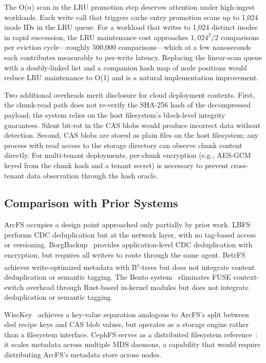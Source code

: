 \documentclass[5p,times]{elsarticle}
\begin{document}
The O($n$) scan in the LRU promotion step deserves attention under
high-ingest workloads. Each write call that triggers cache entry promotion
scans up to 1,024 inode IDs in the LRU queue.  For a workload that
writes to 1,024 distinct inodes in rapid succession, the LRU maintenance
cost approaches $1{,}024^2 / 2$ comparisons per eviction cycle---roughly
500,000 comparisons---which at a few nanoseconds each contributes
measurably to per-write latency.  Replacing the linear-scan queue with a
doubly-linked list and a companion hash map of node positions would reduce
LRU maintenance to O(1) and is a natural implementation improvement.

Two additional overheads merit disclosure for cloud deployment contexts.
First, the chunk-read path does not re-verify the SHA-256 hash of the
decompressed payload; the system relies on the host filesystem's
block-level integrity guarantees.  Silent bit-rot in the CAS blobs
would produce incorrect data without detection.  Second, CAS blobs are
stored as plain files on the host filesystem; any process with read
access to the storage directory can observe chunk content directly.
For multi-tenant deployments, per-chunk encryption (e.g., AES-GCM keyed
from the chunk hash and a tenant secret) is necessary to prevent
cross-tenant data observation through the hash oracle.

\subsection{Comparison with Prior Systems}

ArcFS occupies a design point approached only partially by prior work.
LBFS~\cite{muthitacharoen2001lbfs} performs CDC deduplication but at the
network layer, with no tag-based access or versioning.
BorgBackup~\cite{borgbackup2024} provides application-level CDC
deduplication with encryption, but requires all writers to route through
the same agent. BetrFS~\cite{jannen2015betrfs} achieves write-optimized
metadata with B\textsuperscript{$\varepsilon$}-trees but does not integrate
content deduplication or semantic tagging. The Bento
system~\cite{miller2021bento} eliminates FUSE context-switch overhead
through Rust-based in-kernel modules but does not integrate deduplication
or semantic tagging.

WiscKey~\cite{lu2017wisckey} achieves a key-value separation analogous to
ArcFS's split between sled recipe keys and CAS blob values, but operates
as a storage engine rather than a filesystem interface.  CephFS
serves as a distributed filesystem reference~\cite{weil2006ceph}: it scales
metadata across multiple MDS daemons, a capability that would require
distributing ArcFS's metadata store across nodes.
\end{document}
